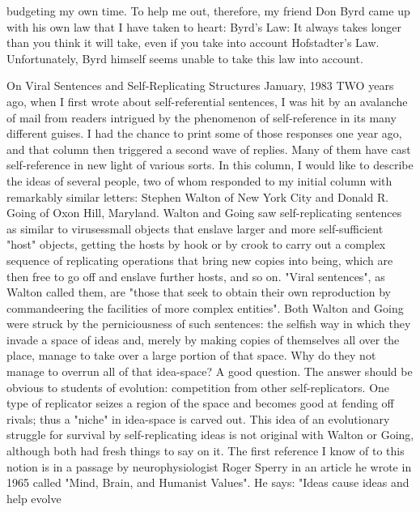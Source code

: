 budgeting my own time. To help me out, therefore, my friend Don Byrd came up with his own law that I have taken to heart: 
Byrd's Law: 
It always takes longer than you think it will take, even if you take into account Hofstadter's Law. 
Unfortunately, Byrd himself seems unable to take this law into account. 



On Viral Sentences and Self-Replicating Structures January, 1983 
TWO years ago, when I first wrote about self-referential sentences, I was hit by an avalanche of mail from readers intrigued by the phenomenon of self-reference in its many different guises. I had the chance to print some of those responses one year ago, and that column then triggered a second wave of replies. Many of them have cast self-reference in new light of various sorts. In this column, I would like to describe the ideas of several people, two of whom responded to my initial column with remarkably similar letters: Stephen Walton of New York City and Donald R. Going of Oxon Hill, Maryland. Walton and Going saw self-replicating sentences as similar to virusessmall objects that enslave larger and more self-sufficient "host" objects, getting the hosts by hook or by crook to carry out a complex sequence of replicating operations that bring new copies into being, which are then free to go off and enslave further hosts, and so on. "Viral sentences", as Walton called them, are "those that seek to obtain their own reproduction by commandeering the facilities of more complex entities". Both Walton and Going were struck by the perniciousness of such sentences: the selfish way in which they invade a space of ideas and, merely by making copies of themselves all over the place, manage to take over a large portion of that space. Why do they not manage to overrun all of that idea-space? A good question. The answer should be obvious to students of evolution: competition from other self-replicators. One type of replicator seizes a region of the space and becomes good at fending off rivals; thus a "niche" in idea-space is carved out. This idea of an evolutionary struggle for survival by self-replicating ideas is not original with Walton or Going, although both had fresh things to say on it. The first reference I know of to this notion is in a passage by neurophysiologist Roger Sperry in an article he wrote in 1965 called "Mind, Brain, and Humanist Values". He says: "Ideas cause ideas and help evolve 

\bye
